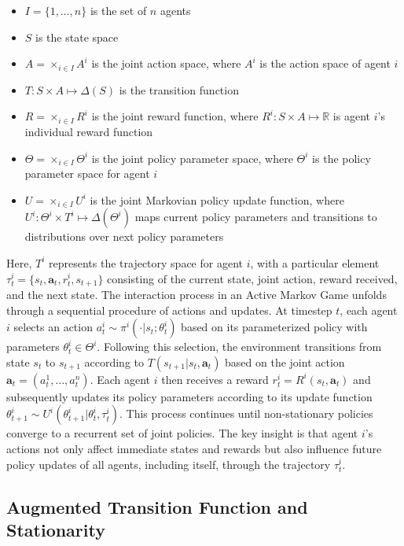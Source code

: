 \begin{itemize}
    \item $I = \{1, \ldots, n\}$ is the set of $n$ agents
    \item $S$ is the state space
    \item $A = \times_{i \in I} A^i$ is the joint action space, where $A^i$ is the action space of agent $i$
    \item $T: S \times A \mapsto \Delta(S)$ is the transition function
    \item $R = \times_{i \in I} R^i$ is the joint reward function, where $R^i: S \times A \mapsto \mathbb{R}$ is agent $i$'s individual reward function
    \item $\Theta = \times_{i \in I} \Theta^i$ is the joint policy parameter space, where $\Theta^i$ is the policy parameter space for agent $i$
    \item $U = \times_{i \in I} U^i$ is the joint Markovian policy update function, where $U^i: \Theta^i \times T^i \mapsto \Delta(\Theta^i)$ maps current policy parameters and transitions to distributions over next policy parameters
\end{itemize}
Here, $T^i$ represents the trajectory space for agent $i$, with a particular element $\tau^i_t = \{s_t, \mathbf{a}_t, r^i_t, s_{t+1}\}$ consisting of the current state, joint action, reward received, and the next state. The interaction process in an Active Markov Game unfolds through a sequential procedure of actions and updates. At timestep $t$, each agent $i$ selects an action $a^i_t \sim \pi^i(\cdot|s_t; \theta^i_t)$ based on its parameterized policy with parameters $\theta^i_t \in \Theta^i$. Following this selection, the environment transitions from state $s_t$ to $s_{t+1}$ according to $T(s_{t+1}|s_t, \mathbf{a}_t)$ based on the joint action $\mathbf{a}_t = (a^1_t, \ldots, a^n_t)$. Each agent $i$ then receives a reward $r^i_t = R^i(s_t, \mathbf{a}_t)$ and subsequently updates its policy parameters according to its update function $\theta^i_{t+1} \sim U^i(\theta^i_{t+1}|\theta^i_t, \tau^i_t)$. This process continues until non-stationary policies converge to a recurrent set of joint policies. The key insight is that agent $i$'s actions not only affect immediate states and rewards but also influence future policy updates of all agents, including itself, through the trajectory $\tau^i_t$.

\subsection{Augmented Transition Function and Stationarity}


